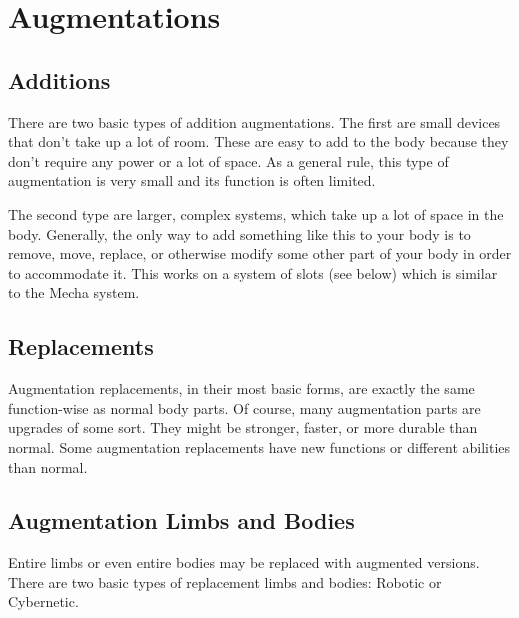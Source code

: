 \documentclass[twoside]{book}
\begin{document}
    

\chapter{Augmentations}
    
    

\section{Additions}
    
    {  
     There are two basic types of addition augmentations.
             The first are small devices that don't take up a lot
             of room. These are easy to add to the body because they
             don't require any power or a lot of space. As a
             general rule, this type of augmentation is very small and
             its function is often limited. 
    }
  
    {  
     The second type are larger, complex systems, which
             take up a lot of space in the body. Generally, the only way
             to add something like this to your body is to remove, move,
             replace, or otherwise modify some other part of your body in
             order to accommodate it. This works on a system of slots
             (see below) which is similar to the Mecha system. 
    }
  
    

\section{Replacements}
    
    {  
     Augmentation replacements, in their most basic forms,
             are exactly the same function-wise as normal body parts. Of
             course, many augmentation parts are upgrades of some sort.
             They might be stronger, faster, or more durable than normal.
             Some augmentation replacements have new functions or
             different abilities than normal. 
    }
  
    

\section{Augmentation Limbs and Bodies}
    
    {  
     Entire limbs or even entire bodies may be replaced
             with augmented versions. There are two basic types of
             replacement limbs and bodies: Robotic or Cybernetic. 
    }
  
\end{document}
